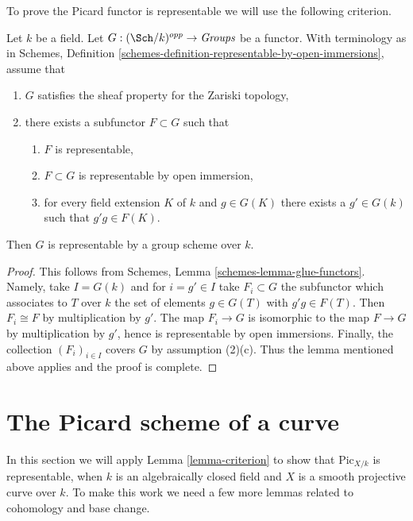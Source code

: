 \noindent
To prove the Picard functor is representable we will use the following
criterion.

\begin{lemma}
\label{lemma-criterion}
Let $k$ be a field. Let $G : (\Sch/k)^{opp} \to \textit{Groups}$ be a
functor. With terminology as in
Schemes, Definition \ref{schemes-definition-representable-by-open-immersions},
assume that
\begin{enumerate}
\item $G$ satisfies the sheaf property for the Zariski topology,
\item there exists a subfunctor $F \subset G$ such that
\begin{enumerate}
\item $F$ is representable,
\item $F \subset G$ is representable by open immersion,
\item for every field extension $K$ of $k$ and $g \in G(K)$
there exists a $g' \in G(k)$ such that $g'g \in F(K)$.
\end{enumerate}
\end{enumerate}
Then $G$ is representable by a group scheme over $k$.
\end{lemma}

\begin{proof}
This follows from Schemes, Lemma \ref{schemes-lemma-glue-functors}.
Namely, take $I = G(k)$ and for $i = g' \in I$ take $F_i \subset G$
the subfunctor which associates to $T$ over $k$ the set of elements
$g \in G(T)$ with $g'g \in F(T)$. Then $F_i \cong F$ by multiplication
by $g'$. The map $F_i \to G$ is isomorphic to the map $F \to G$
by multiplication by $g'$, hence is representable by open immersions.
Finally, the collection $(F_i)_{i \in I}$ covers $G$ by assumption (2)(c).
Thus the lemma mentioned above applies and the proof is complete.
\end{proof}



\section{The Picard scheme of a curve}
\label{section-picard-curve}

\noindent
In this section we will apply Lemma \ref{lemma-criterion} to show that
$\text{Pic}_{X/k}$ is representable, when $k$ is an algebraically
closed field and $X$ is a smooth projective curve over $k$. To make this
work we need a few more lemmas related to cohomology and base change.

